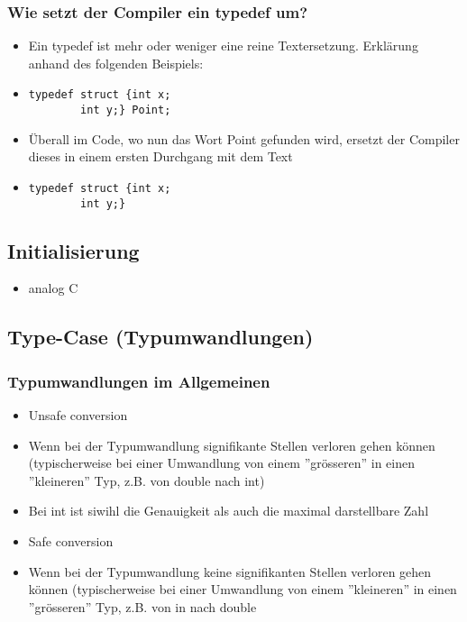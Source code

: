 \subsubsection{Wie setzt der Compiler ein typedef um?\hfill}
\label{sec:Wie setzt der Compiler ein typedef um?}
\begin{itemize}
	\item Ein typedef ist mehr oder weniger eine reine Textersetzung. Erklärung anhand des folgenden Beispiels:
	\item[\-]
\noindent
\begin{minipage}{\linewidth}
\begin{lstlisting}
typedef struct {int x;
		int y;} Point;
\end{lstlisting}
\end{minipage}
	\item Überall im Code, wo nun das Wort Point gefunden wird, ersetzt der Compiler dieses in einem ersten Durchgang mit dem Text 
	\item[\-]
\noindent
\begin{minipage}{\linewidth}
\begin{lstlisting}
typedef struct {int x;
		int y;}
\end{lstlisting}
\end{minipage}	
\end{itemize}

\subsection{Initialisierung\hfill}
\label{sec:Initialisierung}
\begin{itemize}
	\item analog C
\end{itemize}

\subsection{Type-Case (Typumwandlungen)\hfill}
\label{sec:Type-Case (Typumwandlungen)}

\subsubsection{Typumwandlungen im Allgemeinen\hfill}
\label{sec:Typumwandlungen im Allgemeinen}
\begin{itemize}
	\item Unsafe conversion
	\item[\-] Wenn bei der Typumwandlung signifikante Stellen verloren gehen können (typischerweise bei einer Umwandlung von einem ''grösseren'' in einen ''kleineren'' Typ, z.B. von double nach int)
	\item[\-] Bei int ist siwihl die Genauigkeit als auch die maximal darstellbare Zahl
	\item Safe conversion
	\item[\-] Wenn bei der Typumwandlung keine signifikanten Stellen verloren gehen können (typischerweise bei einer Umwandlung von einem ''kleineren'' in einen ''grösseren'' Typ, z.B. von in nach double
\end{itemize}

